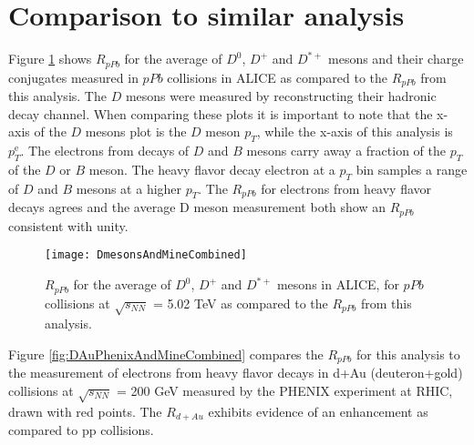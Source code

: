\section{Comparison to similar analysis}

Figure \ref{fig:Dmesons} shows $R_{pPb}$ for the average of $D^{0}$, $D^{+}$ and $D^{*+}$ mesons and their charge conjugates measured in $pPb$ collisions in ALICE \cite{Abelev:2014hha} as compared to the $R_{pPb}$ from this analysis. The $D$ mesons were measured by reconstructing their hadronic decay channel. When comparing these plots it is important to note that the x-axis of the $D$ mesons plot is the $D$ meson $p_{T}$, while the x-axis of this analysis is $p^{\mathrm{e}}_{T}$. The electrons from decays of $D$ and $B$ mesons carry away a fraction of the $p_{T}$ of the $D$ or $B$ meson. The heavy flavor decay electron at a $p_{T}$ bin samples a range of $D$ and $B$ mesons at a higher $p_{T}$. The $R_{pPb}$ for electrons from heavy flavor decays agrees and the average D meson measurement both show an $R_{pPb}$ consistent with unity. 

\begin{figure}[h]
  \centering
  \texttt{[image: DmesonsAndMineCombined]}\\
  \caption{$R_{pPb}$ for the average of $D^{0}$, $D^{+}$ and $D^{*+}$ mesons \cite{Abelev:2014hha} in ALICE, for $pPb$ collisions at $\sqrt{s_{NN}}$ = 5.02 TeV as compared to the $R_{pPb}$ from this analysis.} \label{fig:Dmesons}
\end{figure}

Figure \ref{fig:DAuPhenixAndMineCombined} compares the $R_{pPb}$ for this analysis to the measurement of electrons from heavy flavor decays in d+Au (deuteron+gold) collisions at $\sqrt{s_{NN}}$ = 200 GeV measured by the PHENIX experiment at RHIC, drawn with red points. The $R_{d+Au}$ exhibits evidence of an enhancement as compared to pp collisions. 



